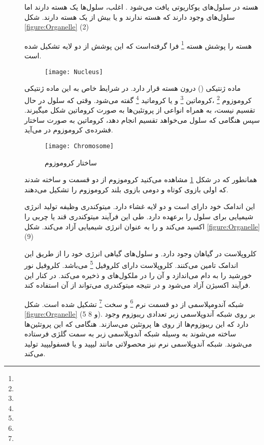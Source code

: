 \begin{description}
\item[]

هسته در سلول‌های یوکاریوتی یافت می‌شود . اغلب، سلول‌ها یک هسته دارند اما سلول‌های وجود دارند که هسته ندارند و یا بیش از یک هسته دارند.
شکل
\ref{figure:Organelle}
(2)

 هسته را پوشش هسته
\footnote{}
فرا گرفته‌است که این پوشش از دو لایه تشکیل شده است.

\begin{figure}[h]
	\centering
	\texttt{[image: Nucleus]}
\end{figure}

ماده ژنتیکی
()
درون هسته قرار دارد.  در شرایط خاص به این ماده ژنتیکی کروموزوم
\footnote{}
،کروماتین
\footnote{}
و یا کروماتید
\footnote{}
گفته می‌شود.
وقتی که سلول در حال تقسیم نیست،	
به همراه انواعی از پروتئین‌ها به صورت کروماتین شکل میگیرند. سپس هنگامی که سلول می‌خواهد تقسیم انجام دهد، کروماتین به صورت ساختار فشرده‌ی کروموزوم در  می‌آید.

\begin{figure}[htbp]
	\centering
	\texttt{[image: Chromosome]}
	\caption{ساختار کروموزوم}
	\label{figure:Chromosome}
\end{figure}

همانطور که در شکل
\ref{figure:Chromosome}
مشاهده می‌کنید کروموزوم از دو قسمت
و
ساخته شدند که اولی بازوی کوتاه و دومی بازوی بلند کروموزوم را تشکیل می‌دهند.

\item[]
این اندامک خود دارای
است و دو لایه غشاء دارد. میتوکندری وظیفه تولید انرژی شیمیایی برای سلول را برعهده دارد. طی این فرآیند میتوکندری قند یا چربی را اکسید می‌کند و
را به عنوان انرژی شیمیایی آزاد می‌کند.
شکل
\ref{figure:Organelle}
(9)

\item[]
کلروپلاست در گیاهان وجود دارد. و سلول‌های گیاهی انرژی خود را از طریق این اندامک تامین می‌کنند. کلروپلاست دارای کلروفیل
\footnote{}
می‌باشد. کلروفیل نور خورشید را به دام می‌اندازد و آن را در ملکول‌های
و
ذخیره می‌کند. در کنار این فرآیند اکسیژن آزاد می‌شود و در نتیجه میتوکندری می‌تواند از آن استفاده کند.

\item[]
شبکه آندومپلاسمی از دو قسمت نرم
\footnote{}
و سخت
\footnote{}
تشکیل شده است. شکل
\ref{figure:Organelle}
(5 و 8).
بر روی شبکه آندوپلاسمی زبر تعدادی ریبوزوم  وجود دارد که این ریبوزوم‌ها از روی 
ها پروتئین می‌سازند. هنگامی که این پروتئین‌ها ساخته می‌شوند به وسیله شبکه آندوپلاسمی زبر به سمت گلژی فرستاده می‌شوند.
 شبکه آندوپلاسمی نرم نیز محصولاتی مانند لیپید و یا فسفولیپید تولید می‌کند.
 

\end{description}
